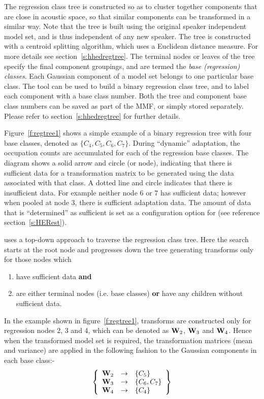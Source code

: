 The regression class tree is constructed so as to cluster together
components that are close in acoustic space, so that similar
components can be transformed in a similar way.  Note that the tree is
built using the original speaker independent model set, and is thus
independent of any new speaker.  The tree is constructed with a
centroid splitting algorithm, which uses a Euclidean distance
measure. For more details see section~\ref{s:hhedregtree}.  The
terminal nodes or leaves of the tree specify the final component
groupings, and are termed the \textit{base (regression) classes}. Each
Gaussian component of a model set belongs to one particular base
class. The tool  can be used to build a binary regression
class tree, and to label each component with a base class number.
Both the tree and component base class numbers can be saved as part of
the MMF, or simply stored separately. Please refer to
section~\ref{s:hhedregtree} for further details.

Figure~\ref{f:regtree1} shows a simple example of a binary regression
tree with four base classes, denoted as $\{C_4, C_5, C_6,
C_7\}$. During ``dynamic'' adaptation, the occupation counts are
accumulated for each of the regression base classes. The diagram shows
a solid arrow and circle (or node), indicating that there is
sufficient data for a transformation matrix to be generated using the
data associated with that class. A dotted line and circle indicates
that there is insufficient data. For example neither node 6 or 7 has
sufficient data; however when pooled at node 3, there is sufficient
adaptation data.  The amount of data that is ``determined'' as
sufficient is set as a configuration option for  (see
reference section~\ref{s:HERest}).

 uses a top-down approach to traverse the regression
class tree. Here the search starts at the root node and progresses
down the tree generating transforms only for those nodes which
\begin{enumerate}
\item have sufficient data \textbf{and}
\item are either terminal nodes (i.e. base classes) \textbf{or} have
any children without sufficient data.
\end{enumerate}

In the example shown in figure~\ref{f:regtree1}, transforms are constructed
only for regression nodes 2, 3 and 4, which can be denoted as
${\bf W}_2$, ${\bf W}_3$ and ${\bf W}_4$. Hence when the transformed
model set is required, the transformation matrices (mean and variance)
are applied in the following fashion to the Gaussian components in
each base class:-
\[
        \left\{
        \begin{array}{ccl}
                {\bf W}_2 & \rightarrow & \left\{C_5\right\} \\
                {\bf W}_3 & \rightarrow & \left\{C_6, C_7\right\} \\
                {\bf W}_4 & \rightarrow & \left\{C_4\right\}
        \end{array}
        \right\}
\]


